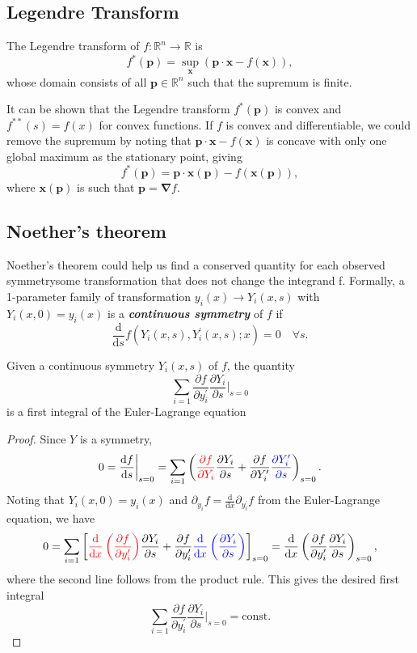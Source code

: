 \documentclass{article}
\theoremstyle{nonumberplain}
\newtheorem{proof}{Proof}
\begin{document}
\subsection{Legendre Transform}
\begin{frm-def}
    The Legendre transform of $f
        \colon \mathbb{R}^n \to \mathbb{R}
    $ is 
    \[
        f^*(\mathbf{p} ) = \sup_{\mathbf{x} } \left(\mathbf{p}  \cdot \mathbf{x}  - f(\mathbf{x} )\right), 
    \]
    whose domain consists of all $\mathbf{p}  \in \mathbb{R}^n$ such that the supremum is finite. 
\end{frm-def}
It can be shown that the Legendre transform $f^*(\mathbf{p} )$ is convex and $f^{**}(s) = f(x) $ for convex functions. If $f$ is convex and differentiable, we could remove the supremum by noting that $\mathbf{p}  \cdot \mathbf{x}  - f(\mathbf{x} )$ is concave with only one global maximum as the stationary point, giving
\[
    f^*(\mathbf{p} ) = \mathbf{p}  \cdot \mathbf{x} (\mathbf{p} ) - f(\mathbf{x} (\mathbf{p} )), 
\] 
where $\mathbf{x}(\mathbf{p} )$ is such that $\mathbf{p}  = \mathbf{\nabla} f.$
\subsection{Noether's theorem}
Noether's theorem could help us find a conserved quantity for each observed symmetry\textemdash some transformation that does not change the integrand f. Formally, a 1-parameter family of transformation $y_i (x) \to Y_i (x,s)$ with $Y_i (x,0 ) = y_i(x)$ is a \textit{\textbf{continuous symmetry}} of $f$ if 
\[
    \frac{\mathrm{d}}{\mathrm{d}s}  f(Y_i(x,s), Y_i^\prime (x,s) ; x) = 0 \quad \forall s. 
\] 
\begin{frm-thm}
    Given a continuous symmetry $Y_i (x,s)$ of $f$, the quantity 
    \[
        \sum_{i=1} \frac{\partial f}{\partial y_i^\prime } \frac{\partial Y_i}{\partial s} \bigg \rvert_{s=0} 
    \]
    is a first integral of the Euler-Lagrange equation  
\end{frm-thm}
\begin{proof}
    Since $Y$ is a symmetry, 
    \[
        0 = \frac{\mathrm{d}f}{\mathrm{d}s} \bigg \rvert_{s=0}
        = \sum_{i=1} \left( \textcolor{red}{\frac{\partial f}{\partial Y_i}} \frac{\partial Y_i}{\partial s} 
        + \frac{\partial f}{\partial Y_i^\prime } \textcolor{blue}{\frac{\partial Y_i^\prime }{\partial s}} \right)_{s=0}. 
    \]
    Noting that $Y_i(x,0) = y_i(x)$ and $\partial_{y_i} f  = \frac{\mathrm{d}}{\mathrm{d}x} \partial_{y_i^\prime } f$ from the Euler-Lagrange equation, we have 
    \[
        0 = \sum_{i=1} \left[ \textcolor{red}{\frac{\mathrm{d}}{\mathrm{d}x} \left(\frac{\partial f}{\partial y_i^\prime } \right)} \frac{\partial Y_i}{\partial s} + \frac{\partial f}{\partial y_i^\prime } \textcolor{blue}{\frac{\mathrm{d}}{\mathrm{d}x} \left(\frac{\partial Y_i}{\partial s} \right)}\right]_{s=0} 
        = \frac{\mathrm{d}}{\mathrm{d}x} \left(\frac{\partial f}{\partial y_i^\prime } \frac{\partial Y_i}{\partial s} \right)_{s=0},
    \]
where the second line follows from the product rule. This gives the desired first integral 
\[
    \sum_{i=1} \frac{\partial f}{\partial y_i^\prime } \frac{\partial Y_i}{\partial s} \bigg \rvert_{s=0} 
    = \text{const}.
\]
\end{proof}
\end{document}
